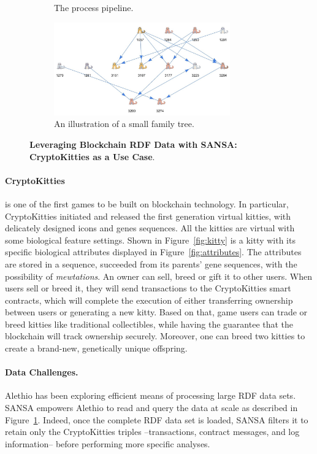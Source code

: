 \begin{figure}[t]
\begin{subfigure}[b]{0.5\textwidth}
\caption{The process pipeline.}
\label{fig:pipeline}
\end{subfigure}
\begin{subfigure}[b]{0.5\textwidth}
\centering
\includegraphics[height=4cm,width=\textwidth]{images/7_implemenation_and_usecases/incest-crop.jpeg}
\caption{An illustration of a small family tree.}
\label{fig:incest}
\end{subfigure}
\caption{\textbf{Leveraging Blockchain RDF Data with SANSA: CryptoKitties as a Use Case}.}
\label{fig:crypto-sansa}
\end{figure}

\paragraph*{CryptoKitties} is one of the first games to be built on blockchain technology.
In particular, CryptoKitties initiated and released the first generation virtual kitties, with delicately designed icons and genes sequences. 
All the kitties are virtual with some biological feature settings. 
Shown in Figure~\ref{fig:kitty} is a kitty with its specific biological attributes displayed in Figure~\ref{fig:attributes}. 
The attributes are stored in a sequence, succeeded from its parents' gene sequences, with the possibility of \textit{mewtations}.
An owner can sell, breed or gift it to other users.
When users sell or breed it, they will send transactions to the CryptoKitties smart contracts, which will complete the execution of either transferring ownership between users or generating a new kitty.
Based on that, game users can trade or breed kitties like traditional collectibles, while having the guarantee that the blockchain will track ownership securely. 
Moreover, one can breed two kitties to create a brand-new, genetically unique offspring.

\paragraph*{Data Challenges.}
Alethio has been exploring efficient means of processing large \gls{RDF} data sets. 
SANSA empowers Alethio to read and query the data at scale as described in Figure~\ref{fig:pipeline}. 
Indeed, once the complete \gls{RDF} data set is loaded, SANSA filters it to retain only the CryptoKitties triples --transactions, contract messages, and log information-- before performing more specific analyses.

